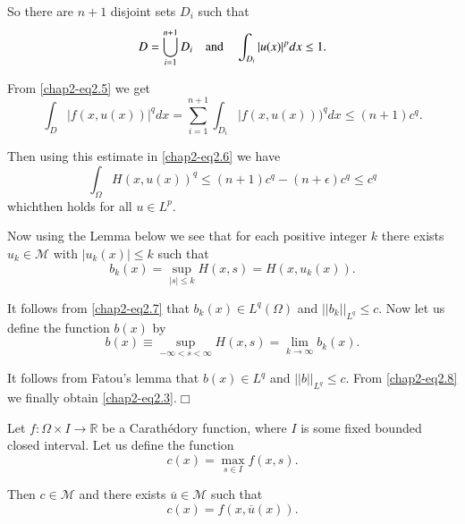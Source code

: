 So there are $n+1$ disjoint sets $D_{i}$ such that
$$
D=\bigcup\limits^{n+1}_{i=1}D_{i}\quad\text{and}\quad
\int_{D_{i}}|u(x)|^{p}dx\leq 1.
$$

From \eqref{chap2-eq2.5} we get
$$
\int_{D}|f(x,u(x))|^{q}dx=\sum\limits^{n+1}_{i=1}\int_{D_{i}}|f(x,u(x)))^{q}dx\leq
(n+1)c^{q}. 
$$

Then using this estimate in \eqref{chap2-eq2.6} we have
\begin{equation*}
\int_{\Omega}H(x,u(x))^{q}\leq (n+1)c^{q}-(n+\epsilon)c^{q}\leq
c^{q}\tag{2.7}\label{chap2-eq2.7} 
\end{equation*}
which\pageoriginale then holds for all $u\in L^{p}$.

Now using the Lemma below we see that for each positive integer $k$
there exists $u_{k}\in \mathcal{M}$ with $|u_{k}(x)|\leq k$ such that
$$
b_{k}(x)=\sup\limits_{|s|\leq k}H(x,s)=H(x,u_{k}(x)).
$$

It follows from \eqref{chap2-eq2.7} that $b_{k}(x)\in L^{q}(\Omega)$
and $||b_{k}||_{L^{q}}\leq c$. Now let us define the function $b(x)$
by
\begin{equation*}
b(x)\equiv \sup\limits_{-\infty<s<\infty}H(x,s)=\lim\limits_{k\to
  \infty}b_{k}(x).\tag{2.8}\label{chap2-eq2.8} 
\end{equation*}

It follows from Fatou's lemma that $b(x)\in L^{q}$ and
$||b||_{L^{q}}\leq c$. From \eqref{chap2-eq2.8} we finally obtain
\eqref{chap2-eq2.3}.\hfill$\Box$

\begin{lemma*}
Let $f:\Omega\times I\to \mathbb{R}$ be a Carath\'edory function,
where $I$ is some fixed bounded closed interval. Let us define the
function
$$
c(x)=\max\limits_{s\in I}f(x,s).
$$

Then $c\in \mathcal{M}$ and there exists $\overline{u}\in \mathcal{M}$
such that
\begin{equation*}
c(x)=f(x,\overline{u}(x)).\tag{2.9}\label{chap2-eq2.9} 
\end{equation*}
\end{lemma*}

